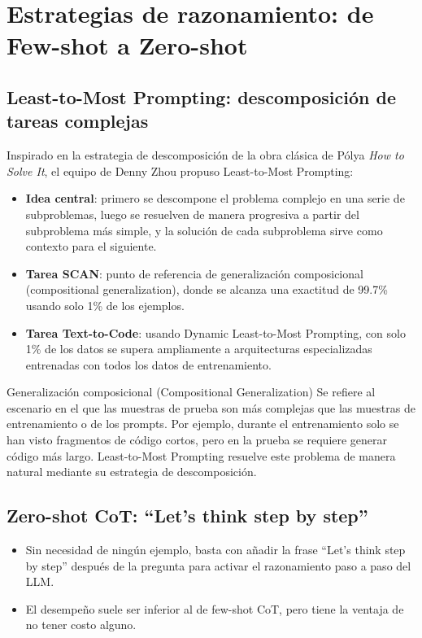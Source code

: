 \section{Estrategias de razonamiento: de Few-shot a Zero-shot}

\subsection{Least-to-Most Prompting: descomposición de tareas complejas}

Inspirado en la estrategia de descomposición de la obra clásica de P\'{o}lya \textit{How to Solve It}, el equipo de Denny Zhou propuso Least-to-Most Prompting:

\begin{itemize}
    \item \textbf{Idea central}: primero se descompone el problema complejo en una serie de subproblemas, luego se resuelven de manera progresiva a partir del subproblema más simple, y la solución de cada subproblema sirve como contexto para el siguiente.
    \item \textbf{Tarea SCAN}: punto de referencia de generalización composicional (compositional generalization), donde se alcanza una exactitud de 99.7\% usando solo 1\% de los ejemplos.
    \item \textbf{Tarea Text-to-Code}: usando Dynamic Least-to-Most Prompting, con solo 1\% de los datos se supera ampliamente a arquitecturas especializadas entrenadas con todos los datos de entrenamiento.
\end{itemize}

\begin{knowledgebox}{Generalización composicional (Compositional Generalization)}
Se refiere al escenario en el que las muestras de prueba son más complejas que las muestras de entrenamiento o de los prompts. Por ejemplo, durante el entrenamiento solo se han visto fragmentos de código cortos, pero en la prueba se requiere generar código más largo. Least-to-Most Prompting resuelve este problema de manera natural mediante su estrategia de descomposición.
\end{knowledgebox}

\subsection{Zero-shot CoT: ``Let's think step by step''}

\begin{itemize}
    \item Sin necesidad de ningún ejemplo, basta con añadir la frase ``Let's think step by step'' después de la pregunta para activar el razonamiento paso a paso del LLM.
    \item El desempeño suele ser inferior al de few-shot CoT, pero tiene la ventaja de no tener costo alguno.
\end{itemize}

